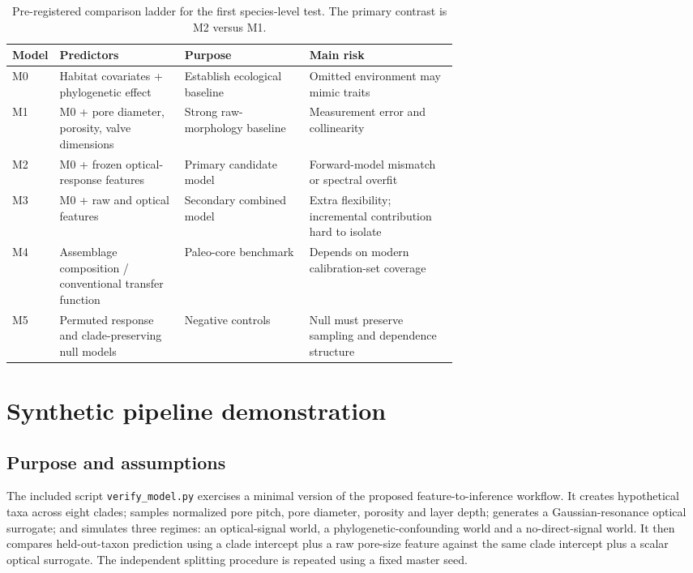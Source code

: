 \documentclass[11pt,a4paper]{article}
\begin{document}
\begin{table}[H]
\caption{Pre-registered comparison ladder for the first species-level test. The primary contrast is M2 versus M1.}
\label{tab:models}
\small\begin{tabularx}{\linewidth}{@{}p{0.08\linewidth}p{0.28\linewidth}p{0.28\linewidth}X@{}}
\toprule
Model & Predictors & Purpose & Main risk \\
\midrule
M0 & Habitat covariates + phylogenetic effect & Establish ecological baseline & Omitted environment may mimic traits \\
M1 & M0 + pore diameter, porosity, valve dimensions & Strong raw-morphology baseline & Measurement error and collinearity \\
M2 & M0 + frozen optical-response features & Primary candidate model & Forward-model mismatch or spectral overfit \\
M3 & M0 + raw and optical features & Secondary combined model & Extra flexibility; incremental contribution hard to isolate \\
M4 & Assemblage composition / conventional transfer function & Paleo-core benchmark & Depends on modern calibration-set coverage \\
M5 & Permuted response and clade-preserving null models & Negative controls & Null must preserve sampling and dependence structure \\
\bottomrule\end{tabularx}
\end{table}

\section{Synthetic pipeline demonstration}
\subsection{Purpose and assumptions}
The included script \texttt{verify\_model.py} exercises a minimal version of the proposed feature-to-inference workflow. It creates hypothetical taxa across eight clades; samples normalized pore pitch, pore diameter, porosity and layer depth; generates a Gaussian-resonance optical surrogate; and simulates three regimes: an optical-signal world, a phylogenetic-confounding world and a no-direct-signal world. It then compares held-out-taxon prediction using a clade intercept plus a raw pore-size feature against the same clade intercept plus a scalar optical surrogate. The independent splitting procedure is repeated using a fixed master seed.
\end{document}
